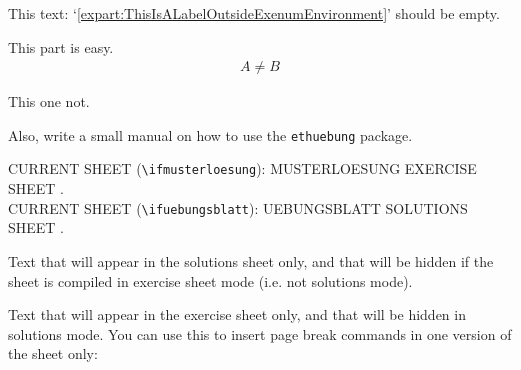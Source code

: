 \documentclass[11pt,a4paper]{article}
\begin{document}
This text: `\ref{expart:ThisIsALabelOutsideExenumEnvironment}' should be empty.

\begin{loesung}
  \begin{exenumerate}
  \item This part is easy.
    \begin{align}
      A \neq B
    \end{align}
  \item This one not.
  \end{exenumerate}
\end{loesung}



\begin{exenumerate}
\item Also, write a small manual on how to use the \texttt{ethuebung} package.
\end{exenumerate}



CURRENT SHEET (\texttt{\textbackslash ifmusterloesung}):
\ifmusterloesung MUSTERLOESUNG \else EXERCISE SHEET \fi .\\
CURRENT SHEET (\texttt{\textbackslash ifuebungsblatt}):
\ifuebungsblatt UEBUNGSBLATT \else SOLUTIONS SHEET \fi .

\begin{onlysolutions} %
Text that will appear in the solutions sheet only, and that will be hidden if the sheet is
compiled in exercise sheet mode (i.e. not solutions mode).
\end{onlysolutions}
\begin{onlyuebungsblatt} %
Text that will appear in the exercise sheet only, and that will be hidden in solutions
mode. You can use this to insert page break commands in one version of the sheet only:

\newpage
\end{onlyuebungsblatt}
\end{document}
